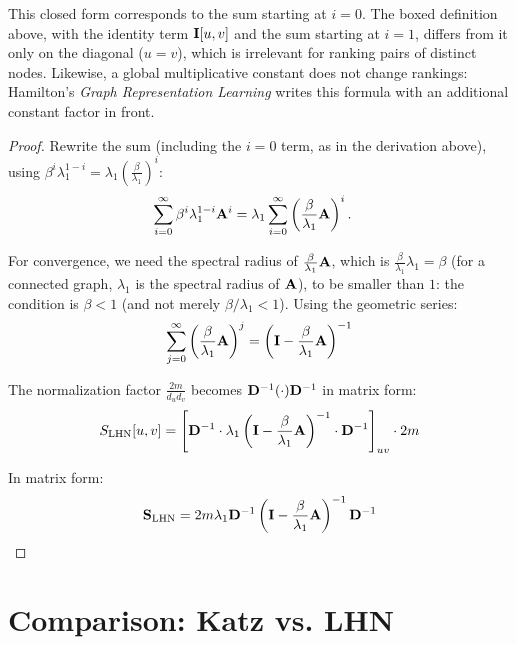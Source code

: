 \begin{notechapter}
\begin{remark}
This closed form corresponds to the sum starting at $i = 0$. The boxed definition above, with the identity
term $\mathbf{I}[u,v]$ and the sum starting at $i = 1$, differs from it only on the diagonal ($u = v$), which is
irrelevant for ranking pairs of distinct nodes. Likewise, a global multiplicative constant does not change
rankings: Hamilton's \emph{Graph Representation Learning} writes this formula with an additional constant
factor in front.
\end{remark}

\begin{proof}
Rewrite the sum (including the $i = 0$ term, as in the derivation above), using
$\beta^i \lambda_1^{1-i} = \lambda_1 \left(\frac{\beta}{\lambda_1}\right)^{i}$:
\begin{align*}
\sum_{i=0}^{\infty} \beta^i \lambda_1^{1-i} \mathbf{A}^i
&= \lambda_1 \sum_{i=0}^{\infty} \left(\frac{\beta}{\lambda_1}\mathbf{A}\right)^{i}.
\end{align*}

For convergence, we need the spectral radius of $\frac{\beta}{\lambda_1}\mathbf{A}$, which is $\frac{\beta}{\lambda_1}\lambda_1 = \beta$ (for a connected graph, $\lambda_1$ is the spectral radius of $\mathbf{A}$), to be smaller than $1$: the condition is $\beta < 1$ (and not merely $\beta/\lambda_1 < 1$). Using the geometric series:
\[
\sum_{j=0}^{\infty} \left(\frac{\beta}{\lambda_1}\mathbf{A}\right)^{j} = \left(\mathbf{I} - \frac{\beta}{\lambda_1}\mathbf{A}\right)^{-1}
\]

The normalization factor $\frac{2m}{d_u d_v}$ becomes $\mathbf{D}^{-1}(\cdot)\mathbf{D}^{-1}$ in matrix form:
\[
S_{\text{LHN}}[u,v] = \left[\mathbf{D}^{-1} \cdot \lambda_1 \left(\mathbf{I} - \frac{\beta}{\lambda_1}\mathbf{A}\right)^{-1} \cdot \mathbf{D}^{-1}\right]_{uv} \cdot 2m
\]

In matrix form:
\[
\mathbf{S}_{\text{LHN}} = 2 m \lambda_1 \mathbf{D}^{-1} \left(\mathbf{I} - \frac{\beta}{\lambda_1}\mathbf{A}\right)^{-1} \mathbf{D}^{-1}
\]
\end{proof}

\section{Comparison: Katz vs. LHN}


\end{notechapter}
